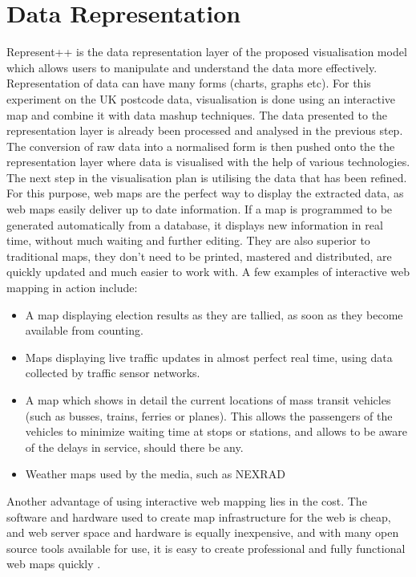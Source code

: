 \section{Data Representation}

Represent++ is the data representation layer of the proposed visualisation model which allows users to manipulate and understand the data more effectively. Representation of data can have many forms (charts, graphs etc). For this experiment on the UK postcode data, visualisation is done using an interactive map and combine it with data mashup techniques. The data presented to the representation layer is already been processed and analysed in the previous step. The conversion of raw data into a normalised form is then pushed onto the the representation layer where data is visualised with the help of various technologies. The next step in the visualisation plan is utilising the data that has been refined. For this purpose, web maps are the perfect way to display the extracted data, as web maps easily deliver up to date information. If a map is programmed to be generated automatically from a database, it displays new information in real time, without much waiting and further editing. They are also superior to traditional maps, they don't need to be printed, mastered and distributed, are quickly updated and much easier to work with.  A few examples of interactive web mapping in action include:

\begin{itemize}
\item 	A map displaying election results as they are tallied, as soon as they become available from counting.

\item	Maps displaying live traffic updates in almost perfect real time, using data collected by traffic sensor networks. 

\item	A map which shows in detail the current locations of mass transit vehicles (such as busses, trains, ferries or planes). This allows the passengers of the vehicles to  minimize waiting time at stops or stations, and allows to be aware of the delays in service, should there be any. 
\item 	Weather maps used by the media, such as NEXRAD \cite{smith1996intercomparison}
\end{itemize}

Another advantage of using interactive web mapping lies in the cost. The software and hardware used to create map infrastructure for the web is cheap, and web server space and hardware is equally inexpensive, and with many open source tools available for use, it is easy to create professional and fully functional web maps quickly \cite{de2006opengis}.\\

